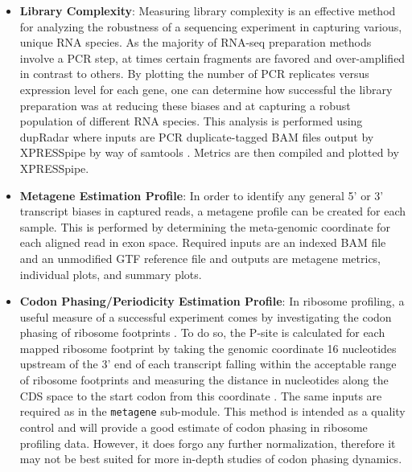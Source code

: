 \documentclass[11pt, a4paper, oneside]{article}
\begin{document}
\begin{enumerate}
\begin{itemize}
      \item \textbf{Library Complexity}: Measuring library complexity is an effective method for analyzing the robustness of a sequencing experiment in capturing various, unique RNA species. As the majority of RNA-seq preparation methods involve a PCR step, at times certain fragments are favored and over-amplified in contrast to others. By plotting the number of PCR replicates versus expression level for each gene, one can determine how successful the library preparation was at reducing these biases and at capturing a robust population of different RNA species. This analysis is performed using dupRadar \cite{dupradar} where inputs are PCR duplicate-tagged BAM files output by XPRESSpipe by way of samtools \cite{samtools}. Metrics are then compiled and plotted by XPRESSpipe.

      \item \textbf{Metagene Estimation Profile}: In order to identify any general 5' or 3' transcript biases in captured reads, a metagene profile can be created for each sample. This is performed by determining the meta-genomic coordinate for each aligned read in exon space. Required inputs are an indexed BAM file and an unmodified GTF reference file and outputs are metagene metrics, individual plots, and summary plots.

      \item \textbf{Codon Phasing/Periodicity Estimation Profile}: In ribosome profiling, a useful measure of a successful experiment comes by investigating the codon phasing of ribosome footprints \cite{ingolia_meth}. To do so, the P-site is calculated for each mapped ribosome footprint by taking the genomic coordinate 16 nucleotides upstream of the 3' end of each transcript falling within the acceptable range of ribosome footprints and measuring the distance in nucleotides along the CDS space to the start codon from this coordinate \cite{ribowaltz}. The same inputs are required as in the \texttt{metagene} sub-module. This method is intended as a quality control and will provide a good estimate of codon phasing in ribosome profiling data. However, it does forgo any further normalization, therefore it may not be best suited for more in-depth studies of codon phasing dynamics.


\end{itemize}
\end{enumerate}
\end{document}
